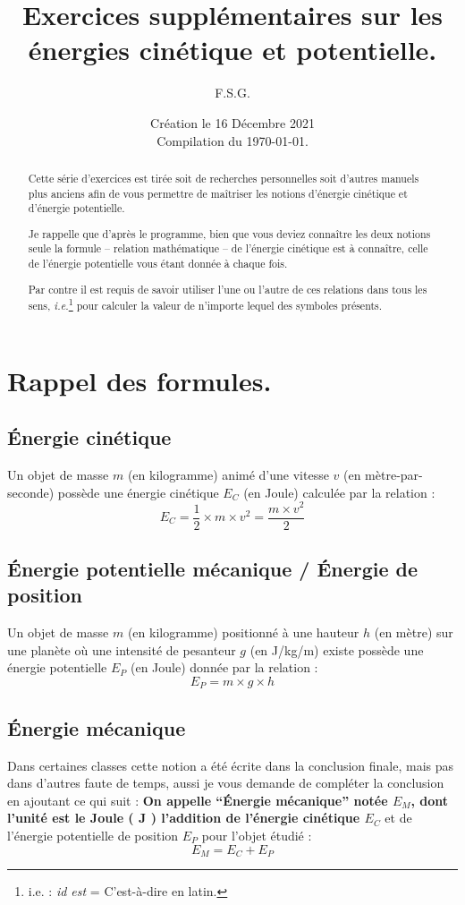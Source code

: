 \documentclass[12pt,a4paper]{article}
\author{F.S.G.}
\date{Création le 16 Décembre 2021\\Compilation du \today .}
\title{Exercices supplémentaires sur les énergies cinétique et potentielle.}
\begin{document}
\maketitle

\begin{abstract}
	Cette série d'exercices est tirée soit de recherches personnelles soit d'autres manuels plus anciens afin de vous permettre de maîtriser les notions d'énergie cinétique et d'énergie potentielle.
	
	Je rappelle que d'après le programme, bien que vous deviez connaître les deux notions seule la formule -- relation mathématique -- de l'énergie cinétique est à connaître, celle de l'énergie potentielle vous étant donnée à chaque fois.
	
	Par contre il est requis de savoir utiliser l'une ou l'autre de ces relations dans tous les sens, \emph{i.e.}\footnote{i.e. : \emph{id est} = C'est-à-dire en latin.} pour calculer la valeur de n'importe lequel des symboles présents.
\end{abstract}

\section*{Rappel des formules.}
\subsection*{Énergie cinétique}
Un objet de masse $m$ (en kilogramme) animé d'une vitesse $v$ (en mètre-par-seconde) possède une énergie cinétique $E_C$ (en Joule) calculée par la relation :
\[
	E_C = \dfrac{1}{2} \times m \times v^2 = \dfrac{m \times v^2}{2}
\]

\subsection*{Énergie potentielle mécanique / Énergie de position}
Un objet de masse $m$ (en kilogramme) positionné à une hauteur $h$ (en mètre) sur une planète où une intensité de pesanteur $g$ (en J/kg/m) existe possède une énergie potentielle $E_P$ (en Joule) donnée par la relation :
\[
	E_P = m \times g \times h
\]

\subsection*{Énergie mécanique}
Dans certaines classes cette notion a été écrite dans la conclusion finale, mais pas dans d'autres faute de temps, aussi je vous demande de compléter la conclusion en ajoutant ce qui suit :
{\color{red} \textbf{On appelle ``Énergie mécanique'' notée $E_M$, dont l'unité est le Joule ( J ) l'addition de l'énergie cinétique $E_C$} et de l'énergie potentielle de position $E_P$ pour l'objet étudié :\newline
\[
	E_M = E_C + E_P
\]
}
\end{document}
